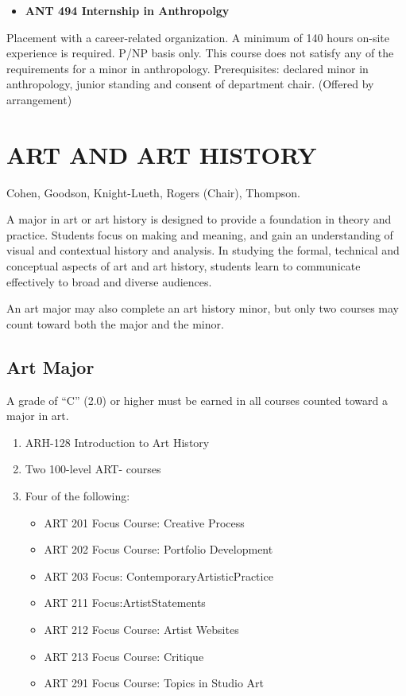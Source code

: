 \documentclass[
  letterpaper,
]{scrbook}
\providecommand{\tightlist}{%
  \setlength{\itemsep}{0pt}\setlength{\parskip}{0pt}}
\begin{document}
\begin{itemize}
\tightlist
\item
  \textbf{ANT 494 Internship in Anthropolgy}
\end{itemize}

Placement with a career-related organization. A minimum of 140 hours
on-site experience is required. P/NP basis only. This course does not
satisfy any of the requirements for a minor in anthropology.
Prerequisites: declared minor in anthropology, junior standing and
consent of department chair. (Offered by arrangement)

\section{ART AND ART HISTORY}\label{art-and-art-history}

Cohen, Goodson, Knight-Lueth, Rogers (Chair), Thompson.

A major in art or art history is designed to provide a foundation in
theory and practice. Students focus on making and meaning, and gain an
understanding of visual and contextual history and analysis. In studying
the formal, technical and conceptual aspects of art and art history,
students learn to communicate effectively to broad and diverse
audiences.

An art major may also complete an art history minor, but only two
courses may count toward both the major and the minor.

\subsection{Art Major}\label{art-major}

A grade of ``C'' (2.0) or higher must be earned in all courses counted
toward a major in art.

\begin{enumerate}
\def\labelenumi{\arabic{enumi}.}
\tightlist
\item
  ARH-128 Introduction to Art History
\item
  Two 100-level ART- courses
\item
  Four of the following:

  \begin{itemize}
  \tightlist
  \item
    ART 201 Focus Course: Creative Process
  \item
    ART 202 Focus Course: Portfolio Development
  \item
    ART 203 Focus: ContemporaryArtisticPractice
  \item
    ART 211 Focus:ArtistStatements
  \item
    ART 212 Focus Course: Artist Websites
  \item
    ART 213 Focus Course: Critique
  \item
    ART 291 Focus Course: Topics in Studio Art
  \end{itemize}
\end{enumerate}
\end{document}

